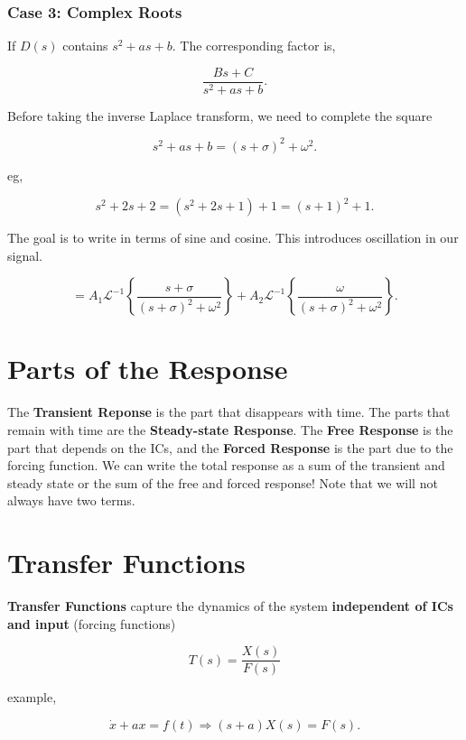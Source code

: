 \documentclass[12pt, a4paper]{report}
\begin{document}
  \subsubsection{Case 3: Complex Roots}

  If $ D(s) $ contains $ s ^2 + as + b. $ The corresponding factor is,

  \[
      \frac{Bs + C}{s ^2 + as + b}
    .\]

  Before taking the inverse Laplace transform, we need to complete the square

  \[
      s ^2 + as + b = (s + \sigma) ^2 + \omega ^2
    .\]

  eg,

  \[
      s ^2 + 2s + 2 = (s ^2 + 2s + 1) + 1 = (s + 1) ^2 + 1
    .\]

  The goal is to write in terms of sine and cosine. This introduces oscillation in our signal.

  \[
      = A_1 \mathcal{L}^{-1}\left\{\frac{s + \sigma}{(s + \sigma) ^2 + \omega ^2}\right\} + A_2 \mathcal{L}^{-1}\left\{\frac{\omega}{(s + \sigma) ^2 + \omega ^2}\right\}
    .\]

  \section{Parts of the Response}

  The \textbf{Transient Reponse} is the part that disappears with time. The parts that remain with time are the \textbf{Steady-state Response}. The \textbf{Free Response} is the part that depends on the ICs, and the \textbf{Forced Response} is the part due to the forcing function. We can write the total response as a sum of the transient and steady state or the sum of the free and forced response! Note that we will not always have two terms.

  \section{Transfer Functions}

  \textbf{Transfer Functions} capture the dynamics of the system \textbf{independent of ICs and input} (forcing functions)

  \begin{equation}
    T(s) = \frac{X(s)}{F(s)}
  \end{equation}

  example,

  \[
      \dot x + ax = f(t) \Rightarrow (s+a)X(s) = F(s)
    .\]
\end{document}
